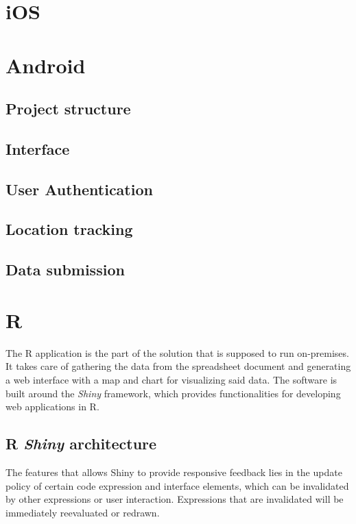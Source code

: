 \section{iOS}



\section{Android}


\subsection{Project structure}


\subsection{Interface}


\subsection{User Authentication}


\subsection{Location tracking}


\subsection{Data submission}



\section{R}
The R application is the part of the solution that is supposed to run on-premises.
It takes care of gathering the data from the spreadsheet document and generating a web interface with a map and chart for visualizing said data.
The software is built around the \emph{Shiny} framework, which provides functionalities for developing web applications in R.


\subsection{R \emph{Shiny} architecture}
The features that allows Shiny to provide responsive feedback lies in the update policy of certain code expression and interface elements, which can be invalidated by other expressions or user interaction.
Expressions that are invalidated will be immediately reevaluated or redrawn.

